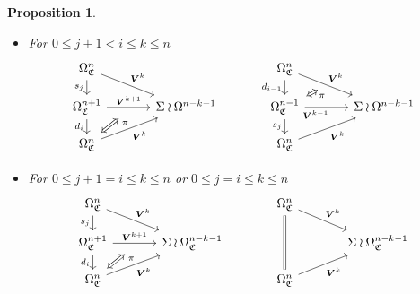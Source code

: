 \documentclass[a4paper,10pt
]{article}%
\numberwithin{equation}{section}
\numberwithin{figure}{section}
\newtheorem{proposition}[equation]{Proposition}%
\theoremstyle{definition} %
\newcommand{\1}{\ensuremath{\mathbbm 1}}%
\begin{document}
\begin{proposition}
\begin{itemize}
		\item[(DF1)]
		For $0 \leq j+1 < i \leq k \leq n $
		\begin{equation}
		\begin{tikzcd}[row sep = 12pt, column sep = 35pt]
		\Omega^{n}_{\mathfrak{C}}
		\arrow{dr}[swap,name=U]{}{\boldsymbol{V}^{k}} \arrow{d}[swap]{s_j} &
		&
		\Omega^{n}_{\mathfrak{C}}
		\arrow{dr}[swap,name=UUU]{}{\boldsymbol{V}^{k}} \arrow{d}[swap]{d_{i-1}} &
		\\
		|[alias=V]|
		\Omega^{n+1}_{\mathfrak{C}} \ar{r}{\boldsymbol{V}^{k+1}}[swap,name=UU]{} \arrow{d}[swap]{d_i}&
		\Sigma \wr \Omega^{n-k-1}
		&
		|[alias=VVV]|
		\Omega^{n-1}_{\mathfrak{C}} \ar{r}[near start, swap]{\boldsymbol{V}^{k-1}}[swap,name=UUUU]{} \ar{d}[swap]{s_j} &
		\Sigma \wr \Omega^{n-k-1}
		\\
		|[alias=VV]|
		\Omega^{n}_{\mathfrak{C}} \arrow{ur}[swap]{\boldsymbol{V}^{k}} &
		&
		|[alias=VVVV]|
		\Omega^{n}_{\mathfrak{C}} \arrow{ur}[swap]{\boldsymbol{V}^{k}} &
		\arrow[Leftrightarrow, from=VV, to=UU,shorten >=0.25cm,shorten <=0.05cm
		,swap,near end,"\pi"
		]
		\arrow[Leftrightarrow, from=VVV, to=UUU,shorten >=0.05cm,shorten <=0.05cm
		,swap,near end,"\pi"
		]
		\end{tikzcd}
		\end{equation}
		
		\item[(DF2)]
		For $0 \leq j+1 = i \leq k \leq n$ or 
		$0 \leq j = i \leq k \leq n$
		\begin{equation}
		\begin{tikzcd}[row sep = 12pt, column sep = 35pt]
		\Omega^n_{\mathfrak{C}}
		\arrow{dr}[swap,name=U]{}{\boldsymbol{V}^k} \arrow{d}[swap]{s_j} &
		&
		\Omega^n_{\mathfrak{C}}
		\arrow{dr}[swap,name=UUU]{}{\boldsymbol{V}^k} \arrow[equal]{dd} &
		\\
		|[alias=V]|
		\Omega^{n+1}_{\mathfrak{C}} \ar{r}{\boldsymbol{V}^{k+1}}[swap,name=UU]{} \arrow{d}[swap]{d_i}&
		\Sigma \wr \Omega^{n-k-1}_{\mathfrak{C}}
		&
		&
		\Sigma \wr \Omega^{n-k-1}_{\mathfrak{C}}
		\\
		|[alias=VV]|
		\Omega^{n}_{\mathfrak{C}} \arrow{ur}[swap]{\boldsymbol{V}^k} &
		&
		|[alias=VVVV]|
		\Omega^{n}_{\mathfrak{C}} \arrow{ur}[swap]{\boldsymbol{V}^k} &
		\arrow[Leftrightarrow, from=VV, to=UU,shorten >=0.25cm,shorten <=0.05cm
		,swap,near end,"\pi"
		]
		\end{tikzcd}
		\end{equation}
		

\end{itemize}
\end{proposition}
\end{document}
